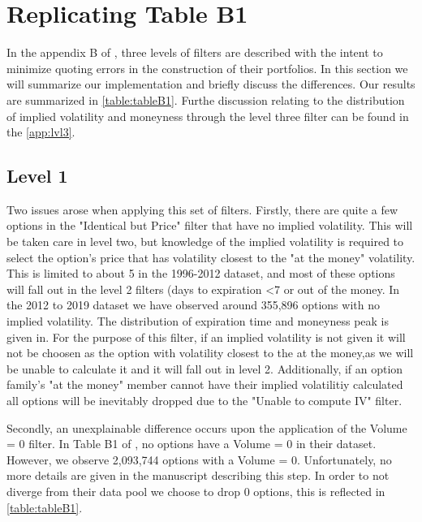 \doublespacing


\section{Replicating Table B1}

In the appendix B of \citet{constantinides2013}, three levels of filters are described with the intent to minimize quoting errors in the construction of their portfolios. In this section we will summarize our implementation and briefly discuss the differences. Our results are summarized in \autoref{table:tableB1}. Furthe discussion relating to the distribution of implied volatility and moneyness through the level three filter can be found in the \autoref{app:lvl3}.

\subsection{Level 1} 
Two issues arose when applying this set of filters. Firstly, there are quite a few options in the "Identical but Price" filter that have no implied volatility. This will be taken care in level two, but knowledge of the implied volatility is required to select the option's price that has volatility closest to the "at the money" volatility. This is limited to about 5 in the 1996-2012 dataset, and most of these options will fall out in the level 2 filters (days to expiration <7 or out of the money. In the 2012 to 2019 dataset we have observed around 355,896 options with no implied volatility. The distribution of expiration time and moneyness peak is  given in. For the purpose of this filter, if an implied volatility is not given it will not be choosen as the option with volatility closest to the at the money,as we will be unable to calculate it and it will fall out in level 2. Additionally, if an option family's "at the money" member cannot have their implied volatilitiy calculated all options will be inevitably dropped due to the "Unable to compute IV" filter. 

Secondly, an unexplainable difference occurs upon the application of the Volume = 0 filter. In Table B1 of \citet{constantinides2013}, no options have a Volume = 0 in their dataset. However, we observe 2,093,744 options with a Volume = 0. Unfortunately, no more details are given in the manuscript describing this step. In order to not diverge from their data pool we choose to drop 0 options, this is reflected in \autoref{table:tableB1}.


